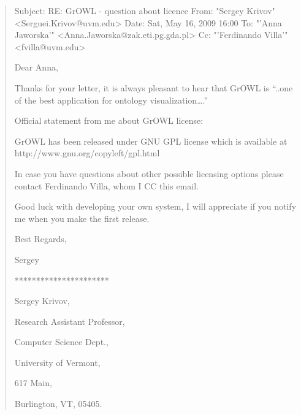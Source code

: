 \documentclass[a4paper,10pt]{article}
\begin{document}
\begin{quote}
 Subject:   	RE: GrOWL - question about licence
From:   	"Sergey Krivov" <Serguei.Krivov@uvm.edu>
Date:   	Sat, May 16, 2009 16:00
To:   	"'Anna Jaworska'" <Anna.Jaworska@zak.eti.pg.gda.pl>
Cc:   	"'Ferdinando Villa'" <fvilla@uvm.edu>

Dear Anna,

Thanks for your letter, it is always pleasant to hear that GrOWL is “..one of the
best application for ontology visualization….”  

 

Official statement from me about GrOWL license:

 

GrOWL has been released under GNU GPL license   which is available at
http://www.gnu.org/copyleft/gpl.html

 

In case you have  questions about other possible licensing options please contact
Ferdinando Villa, whom I CC this email.  

 

Good luck with developing your own system,  I will appreciate if you notify me when
you make the first release. 

 

Best Regards,

Sergey

**********************

Sergey Krivov,

Research Assistant Professor,

Computer Science Dept.,

University of Vermont,

617 Main, 

Burlington, VT, 05405.



\end{quote}
\end{document}
